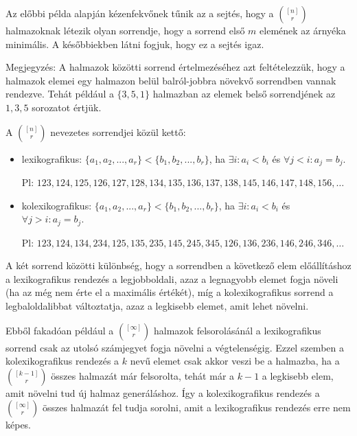 \begin{obs}
  Az előbbi példa alapján kézenfekvőnek tűnik az a sejtés, hogy a $\binom{[n]}{r}$ halmazoknak létezik olyan sorrendje, hogy a sorrend első $m$ elemének az árnyéka minimális. A későbbiekben látni fogjuk, hogy ez a sejtés igaz.
\end{obs}

Megjegyzés: A halmazok közötti sorrend értelmezéséhez azt feltételezzük, hogy a halmazok elemei egy halmazon belül balról-jobbra növekvő sorrendben vannak rendezve. Tehát például a $\{3, 5, 1\}$ halmazban az elemek belső sorrendjének az $1, 3, 5$ sorozatot értjük.

\vspace{1em}

\noindent A $\binom{[n]}{r}$ nevezetes sorrendjei közül kettő:
\begin{itemize}
  \item lexikografikus:\hphantom{ko} $\{a_1, a_2, ..., a_r\} < \{b_1, b_2, ..., b_r\}$, ha $\exists i: a_i < b_i$ és $\forall j < i: a_j = b_j$.

  Pl: $123, 124, 125, 126, 127, 128, 134, 135, 136, 137, 138, 145, 146, 147, 148, 156, \dots$

  \item kolexikografikus: $\{a_1, a_2, ..., a_r\} < \{b_1, b_2, ..., b_r\}$, ha $\exists i: a_i < b_i$ és $\forall j > i: a_j = b_j$.

  Pl: $123, 124, 134, 234, 125, 135, 235, 145, 245, 345, 126, 136, 236, 146, 246, 346, \dots$
\end{itemize}

A két sorrend közötti különbség, hogy a sorrendben a következő elem előállításhoz a lexikografikus rendezés a legjobboldali, azaz a legnagyobb elemet fogja növeli (ha az még nem érte el a maximális értékét), míg a kolexikografikus sorrend a legbaloldalibbat változtatja, azaz a legkisebb elemet, amit lehet növelni.

\medskip

Ebből fakadóan például a $\binom{[\infty]}{r}$ halmazok felsorolásánál a lexikografikus sorrend csak az utolsó számjegyet fogja növelni a végtelenségig. Ezzel szemben a kolexikografikus rendezés a $k$ nevű elemet csak akkor veszi be a halmazba, ha a $\binom{[k-1]}{r}$ összes halmazát már felsorolta, tehát már a $k-1$ a legkisebb elem, amit növelni tud új halmaz generáláshoz. Így a kolexikografikus rendezés a $\binom{[\infty]}{r}$ összes halmazát fel tudja sorolni, amit a lexikografikus rendezés erre nem képes.

